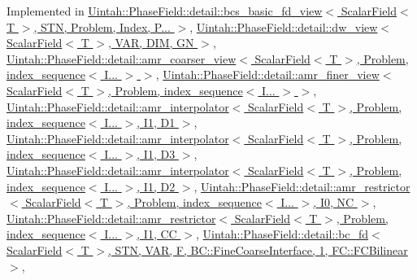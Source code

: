 Implemented in \hyperlink{classUintah_1_1PhaseField_1_1detail_1_1bcs__basic__fd__view_3_01ScalarField_3_01T_01_4_00_01STN_07caa9955adf783da0505eac75e76f08_aef6c3677070fcceb4a3e3c4fe3531e09}{Uintah\+::\+Phase\+Field\+::detail\+::bcs\+\_\+basic\+\_\+fd\+\_\+view$<$ Scalar\+Field$<$ T $>$, S\+T\+N, Problem, Index, P... $>$}, \hyperlink{classUintah_1_1PhaseField_1_1detail_1_1dw__view_3_01ScalarField_3_01T_01_4_00_01VAR_00_01DIM_00_01GN_01_4_a3f5275b8932cb8021465347a523282a1}{Uintah\+::\+Phase\+Field\+::detail\+::dw\+\_\+view$<$ Scalar\+Field$<$ T $>$, V\+A\+R, D\+I\+M, G\+N $>$}, \hyperlink{classUintah_1_1PhaseField_1_1detail_1_1amr__coarser__view_3_01ScalarField_3_01T_01_4_00_01Proble9cadea116dab5bdb44bb3e29abbe99ef_a6e4dba1a59399d5ebc28800155fb4c06}{Uintah\+::\+Phase\+Field\+::detail\+::amr\+\_\+coarser\+\_\+view$<$ Scalar\+Field$<$ T $>$, Problem, index\+\_\+sequence$<$ I... $>$ $>$}, \hyperlink{classUintah_1_1PhaseField_1_1detail_1_1amr__finer__view_3_01ScalarField_3_01T_01_4_00_01Problem_810ae3f886a4d3bdb2b37c629369a2ec_a159ca4d3aaf8d45bd070ad7e4bf3561c}{Uintah\+::\+Phase\+Field\+::detail\+::amr\+\_\+finer\+\_\+view$<$ Scalar\+Field$<$ T $>$, Problem, index\+\_\+sequence$<$ I... $>$ $>$}, \hyperlink{classUintah_1_1PhaseField_1_1detail_1_1amr__interpolator_3_01ScalarField_3_01T_01_4_00_01Problem71844444bc14a03c0566689b6b502040_af37070317967e41c06604969034c2f71}{Uintah\+::\+Phase\+Field\+::detail\+::amr\+\_\+interpolator$<$ Scalar\+Field$<$ T $>$, Problem, index\+\_\+sequence$<$ I... $>$, I1, D1 $>$}, \hyperlink{classUintah_1_1PhaseField_1_1detail_1_1amr__interpolator_3_01ScalarField_3_01T_01_4_00_01Problemdf68628a6010a1e1526666730125c372_af36ec266ac99db41c8d9addb98999112}{Uintah\+::\+Phase\+Field\+::detail\+::amr\+\_\+interpolator$<$ Scalar\+Field$<$ T $>$, Problem, index\+\_\+sequence$<$ I... $>$, I1, D3 $>$}, \hyperlink{classUintah_1_1PhaseField_1_1detail_1_1amr__interpolator_3_01ScalarField_3_01T_01_4_00_01Problemd2db9de1754b5450c93c191a9275f5ed_a014b41daf40384377d58ba9ada6a42ba}{Uintah\+::\+Phase\+Field\+::detail\+::amr\+\_\+interpolator$<$ Scalar\+Field$<$ T $>$, Problem, index\+\_\+sequence$<$ I... $>$, I1, D2 $>$}, \hyperlink{classUintah_1_1PhaseField_1_1detail_1_1amr__restrictor_3_01ScalarField_3_01T_01_4_00_01Problem_05760ee5d1d3adcc969b3f56f71e72acb_a71f5fbbdd3e56e753d19c1d65f5c8467}{Uintah\+::\+Phase\+Field\+::detail\+::amr\+\_\+restrictor$<$ Scalar\+Field$<$ T $>$, Problem, index\+\_\+sequence$<$ I... $>$, I0, N\+C $>$}, \hyperlink{classUintah_1_1PhaseField_1_1detail_1_1amr__restrictor_3_01ScalarField_3_01T_01_4_00_01Problem_0778720acc9a55f696b8537356a4dbcae_ace64828bcebd35f8bbb6bfc203a08c86}{Uintah\+::\+Phase\+Field\+::detail\+::amr\+\_\+restrictor$<$ Scalar\+Field$<$ T $>$, Problem, index\+\_\+sequence$<$ I... $>$, I1, C\+C $>$}, \hyperlink{classUintah_1_1PhaseField_1_1detail_1_1bc__fd_3_01ScalarField_3_01T_01_4_00_01STN_00_01VAR_00_01bd5f5aa94f34afad5c8a785ee391ed2b_acb19e148caf9dd4d85758d1ee9527b67}{Uintah\+::\+Phase\+Field\+::detail\+::bc\+\_\+fd$<$ Scalar\+Field$<$ T $>$, S\+T\+N, V\+A\+R, F, B\+C\+::\+Fine\+Coarse\+Interface, 1, F\+C\+::\+F\+C\+Bilinear $>$}, 